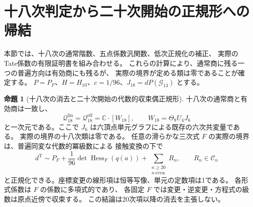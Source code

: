\documentclass[a4paper,11pt]{ltjsarticle}
\theoremstyle{definition}
\newtheorem{theorem}{命題}[section]
\newcommand{\CC}{\mathbb C}
\begin{document}



\section{十八次判定から二十次開始の正規形への帰結}
\label{sec:v14-twentieth}

本節では、十八次の通常階数、五点係数汎関数、低次正規化の補正、
実際のTate係数の有限証明書を組み合わせる。
これらの計算により、通常商に残る一つの普遍方向は有効商にも残るが、
実際の境界が定める類は零であることが確定する。
$P=P_F$、$H=H_{10}$、$c=1/96$、$J_{18}=dP(\mathcal G_{13})$ とする。

\begin{theorem}[十八次の消去と二十次開始の代数的収束偶正規形]
\label{thm:v14-twentieth-normal-form}
十八次の通常商と有効商は一致し、
\[
 \mathcal Q^{\mathrm{lin}}_{18}
 =\mathcal Q^{\mathrm{eff}}_{18}
 =\CC\cdot[W_{18}],\qquad
 W_{18}=\Theta_8U_4J_6
\]
と一次元である。ここで $J_6$ は六頂点単元グラフによる既存の六次共変量である。
実際の境界の十八次類は零である。
任意の滑らかな三次式 $F$ の実際の境界は、普遍同変な代数的冪級数による
接触変換の下で
\begin{equation}\label{eq:v14-twentieth-normal-form}
 \boxed{\displaystyle
 d^{\mathrm T}\sim P_F+\frac1{96}\det\operatorname{Hess}_F(q(a))
       +\sum_{\substack{n\ge20\\n\ \mathrm{even}}}R_n,
 \qquad R_n\in\mathcal C_n
 }
\end{equation}
と正規化できる。座標変更の線形項は恒等写像、単元の定数項は1である。
各形式係数は $F$ の係数に多項式的であり、
各固定 $F$ では変更・逆変更・方程式の級数は原点近傍で収束する。
この結論は20次項以降の消去を主張しない。
\end{theorem}
\end{document}
